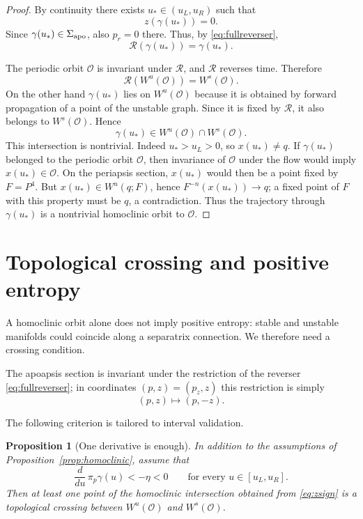 \documentclass[11pt]{article}
\newtheorem{proposition}[theorem]{Proposition}
\newcommand{\cR}{\mathcal R}
\newcommand{\cO}{\mathcal O}
\newcommand{\Wu}{W^{u}}
\newcommand{\Ws}{W^{s}}
\newcommand{\pr}{p_r}
\newcommand{\pz}{p_z}
\begin{document}
\begin{proof}
By continuity there exists $u_*\in(u_L,u_R)$ such that
\[
 z(\gamma(u_*))=0.
\]
Since $\gamma(u_*)\in\Sigma_{\rm apo}$, also $\pr=0$ there.
Thus, by \eqref{eq:fullreverser},
\[
 \cR(\gamma(u_*))=\gamma(u_*).
\]

The periodic orbit $\cO$ is invariant under $\cR$, and $\cR$ reverses time.
Therefore
\[
 \cR(\Wu(\cO))=\Ws(\cO).
\]
On the other hand $\gamma(u_*)$ lies on $\Wu(\cO)$ because it is obtained by
forward propagation of a point of the unstable graph.  Since it is fixed by
$\cR$, it also belongs to $\Ws(\cO)$.  Hence
\[
 \gamma(u_*)\in\Wu(\cO)\cap\Ws(\cO).
\]
This intersection is nontrivial.  Indeed $u_*>u_L>0$, so
$x(u_*)\ne q$.  If $\gamma(u_*)$ belonged to the periodic orbit $\cO$, then
invariance of $\cO$ under the flow would imply $x(u_*)\in\cO$.  On the
periapsis section, $x(u_*)$ would then be a point fixed by $F=P^4$.  But
$x(u_*)\in\Wu(q;F)$, hence $F^{-n}(x(u_*))\to q$; a fixed point of $F$ with
this property must be $q$, a contradiction.  Thus the trajectory through
$\gamma(u_*)$ is a nontrivial homoclinic orbit to $\cO$.
\end{proof}

\section{Topological crossing and positive entropy}\label{sec:crossing}

A homoclinic orbit alone does not imply positive entropy: stable and unstable
manifolds could coincide along a separatrix connection.  We therefore need a
crossing condition.

The apoapsis section is invariant under the restriction of the reverser
\eqref{eq:fullreverser}; in coordinates $(p,z)=(\pz,z)$ this restriction is
simply
\begin{equation}\label{eq:apoReflection}
 (p,z)\longmapsto(p,-z).
\end{equation}

The following criterion is tailored to interval validation.

\begin{proposition}[One derivative is enough]\label{prop:crossing}
In addition to the assumptions of Proposition~\ref{prop:homoclinic}, assume
that
\begin{equation}\label{eq:pmonotone}
 \frac{d}{du}\,\pi_p\gamma(u)<-\eta<0
 \qquad\text{for every }u\in[u_L,u_R].
\end{equation}
Then at least one point of the homoclinic intersection obtained from
\eqref{eq:zsign} is a topological crossing between
$\Wu(\cO)$ and $\Ws(\cO)$.
\end{proposition}
\end{document}
